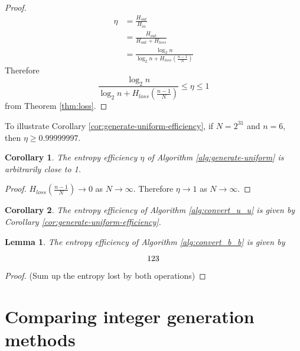 \documentclass[12pt]{article}
\newtheorem{lemma}{Lemma}
\newtheorem{corollary}{Corollary}
\begin{document}
\begin{proof}
\begin{align}
    \eta & = \frac{H_{out}}{H_{in}} \\
         & = \frac{H_{out}}{H_{out}+H_{loss}} \\
         & = \frac{\log_2n}{\log_2n + H_{loss}(\frac{n-1}{N})}
\end{align}
Therefore 
\begin{equation}
\frac{\log_2n}{\log_2n + H_{loss}(\frac{n-1}{N})} \le \eta \le 1
\end{equation}
from Theorem \ref{thm:loss}.
\end{proof}

To illustrate Corollary \ref{cor:generate-uniform-efficiency}, if $N=2^{31}$ and $n=6$, then $\eta \ge 0.99999997$.

\begin{corollary}
The entropy efficiency $\eta$ of Algorithm \ref{alg:generate-uniform} is arbitrarily close to 1.
\end{corollary}

\begin{proof}
$H_{loss}(\frac{n-1}{N}) \rightarrow 0$ as $N \rightarrow \infty$. Therefore $\eta \rightarrow 1$ as $N \rightarrow \infty$.
\end{proof}


\begin{corollary}
The entropy efficiency of Algorithm \ref{alg:convert_u_u} is given by Corollary \ref{cor:generate-uniform-efficiency}.
\end{corollary}

\begin{lemma}
The entropy efficiency of Algorithm \ref{alg:convert_b_b} is given by 

\begin{equation}
$$123$$
\end{equation}

\end{lemma}

\begin{proof}
(Sum up the entropy lost by both operations)

\end{proof}







\section {Comparing integer generation methods}
\end{document}
